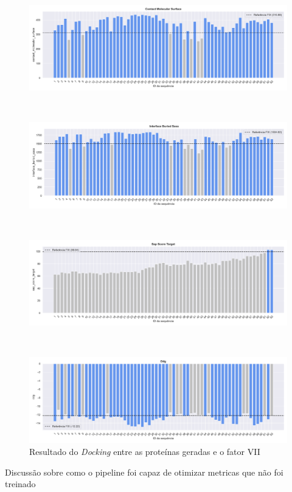 \begin{figure}[htbp]
    \centering
    \begin{minipage}{0.9\textwidth}
        \centering
        \includegraphics[width=\textwidth]{figuras/plot_contact_molecular_surface.png}
    \end{minipage} \\[1ex]%
    \begin{minipage}{0.9\textwidth}
        \centering
        \includegraphics[width=\textwidth]{figuras/plot_interface_buried_sasa.png}
    \end{minipage} \\[1ex] %
    \begin{minipage}{0.9\textwidth}
        \centering
        \includegraphics[width=\textwidth]{figuras/plot_sap_score_target.png}
    \end{minipage} \\[1ex]%
    \begin{minipage}{0.9\textwidth}
        \centering
        \includegraphics[width=\textwidth]{figuras/plot_ddg.png}
    \end{minipage} 
    \caption{Resultado do \textit{Docking} entre as proteínas geradas e o fator VII}
\end{figure}


{\color{red} Discussão sobre como o pipeline foi capaz de otimizar metricas que não foi treinado}